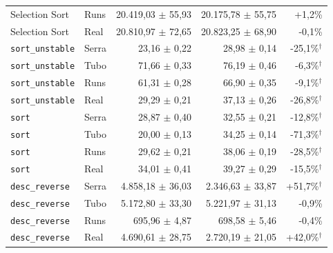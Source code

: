 \begin{tabular}{llrrr}
Selection Sort & Runs & 20.419{,}03 $\pm$ 55{,}93 & 20.175{,}78 $\pm$ 55{,}75 & +1{,}2\% \\
Selection Sort & Real & 20.810{,}97 $\pm$ 72{,}65 & 20.823{,}25 $\pm$ 68{,}90 & -0{,}1\% \\
\texttt{sort\_unstable} & Serra & 23{,}16 $\pm$ 0{,}22 & 28{,}98 $\pm$ 0{,}14 & -25{,}1\%$^{\dagger}$ \\
\texttt{sort\_unstable} & Tubo & 71{,}66 $\pm$ 0{,}33 & 76{,}19 $\pm$ 0{,}46 & -6{,}3\%$^{\dagger}$ \\
\texttt{sort\_unstable} & Runs & 61{,}31 $\pm$ 0{,}28 & 66{,}90 $\pm$ 0{,}35 & -9{,}1\%$^{\dagger}$ \\
\texttt{sort\_unstable} & Real & 29{,}29 $\pm$ 0{,}21 & 37{,}13 $\pm$ 0{,}26 & -26{,}8\%$^{\dagger}$ \\
\texttt{sort} & Serra & 28{,}87 $\pm$ 0{,}40 & 32{,}55 $\pm$ 0{,}21 & -12{,}8\%$^{\dagger}$ \\
\texttt{sort} & Tubo & 20{,}00 $\pm$ 0{,}13 & 34{,}25 $\pm$ 0{,}14 & -71{,}3\%$^{\dagger}$ \\
\texttt{sort} & Runs & 29{,}62 $\pm$ 0{,}21 & 38{,}06 $\pm$ 0{,}19 & -28{,}5\%$^{\dagger}$ \\
\texttt{sort} & Real & 34{,}01 $\pm$ 0{,}41 & 39{,}27 $\pm$ 0{,}29 & -15{,}5\%$^{\dagger}$ \\
\texttt{desc\_reverse} & Serra & 4.858{,}18 $\pm$ 36{,}03 & 2.346{,}63 $\pm$ 33{,}87 & +51{,}7\%$^{\dagger}$ \\
\texttt{desc\_reverse} & Tubo & 5.172{,}80 $\pm$ 33{,}30 & 5.221{,}97 $\pm$ 31{,}13 & -0{,}9\% \\
\texttt{desc\_reverse} & Runs & 695{,}96 $\pm$ 4{,}87 & 698{,}58 $\pm$ 5{,}46 & -0{,}4\% \\
\texttt{desc\_reverse} & Real & 4.690{,}61 $\pm$ 28{,}75 & 2.720{,}19 $\pm$ 21{,}05 & +42{,}0\%$^{\dagger}$ \\
\hline
\end{tabular}
